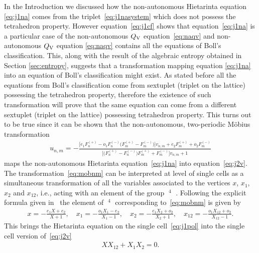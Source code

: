 \documentclass[pdftex]{sigma}
\numberwithin{equation}{section}
\DeclareMathOperator{\Mob}{M\ddot{o}b}
\newcommand{\QV}{Q_{\rm V}}
\begin{document}
In the Introduction we discussed how the non-autonomous
Hietarinta equation \eqref{eq:j1na} comes from the triplet~\eqref{eq:j1nasystem} which does not possess the tetrahedron property.
However equation~\eqref{eq:j1cf} shows that equation~\eqref{eq:j1na}
is a particular case of the non-autonomous $\QV$ equation~\eqref{eq:naqv}
and non-autonomous $\QV$ equation \eqref{eq:naqv} contains
all the equations of Boll's classif\/ication.
This, along with the result of the algebraic entropy obtained in
Section \ref{sec:entropy}, suggests that a transformation mapping
equation \eqref{eq:j1na} into an equation of Boll's classif\/ication might exist.
As stated before all the equations from Boll's classif\/ication come
from sextuplet (triplet on the lattice) possessing the tetrahedron property, therefore the existence
of such transformation will prove that the same equation
can come from a dif\/ferent sextuplet (triplet on the lattice) possessing tetrahedron property.
This turns out to be true since it can be shown that the non-autonomous,
two-periodic M\"obius transformation
\begin{gather}
 u_{n, m} = -\frac{\big[ e_{1} F_{n}^{(+)} - o_{1}F_{n}^{(-)}\big( F_{m}^{(+)}-F_{m}^{(-)} \big) \big]v_{n, m}
 +e_{2}F_{m}^{(+)}+o_{2}F_{m}^{(-)}}{
 \big[ \big( F_{n}^{(+)}-F_{n}^{(-)} \big)F_{m}^{(+)}+F_{m}^{(-)} \big]v_{n, m}+1}
 \label{eq:mobnm}
\end{gather}
maps the non-autonomous Hietarinta equation~\eqref{eq:j1na}
into equation~\eqref{eq:j2v}.
The transformation~\eqref{eq:mobnm} can be interpreted at
level of single cells as a simultaneous transformation of all
the variables associated to the vertices $x$, $x_{1}$, $x_{2}$
and $x_{12}$, i.e., acting with an element of the group
$\Mob^{4}$ \cite{ABS2003,AtkinsonPhD2008,GSL_general}.
Following the explicit formula given in~\cite{GSL_general}
the element of $\Mob^{4}$ corresponding to~\eqref{eq:mobnm}
is given by
\begin{gather}
 x = -\frac{e_{1} X +e_{2}}{X+1},
 \quad
 x_{1} = -\frac{o_{1} X_{1} -e_{2}}{X_{1}-1},
 \quad
 x_{2} = -\frac{e_{1} X_{2}+o_{2}}{X_{2}+1},
 \quad
 x_{12} = -\frac{o_{1} X_{12}+o_{2}}{X_{12}-1}. \label{eq:mob4}
\end{gather}
This brings the Hietarinta equation on the single cell~\eqref{eq:j1pol} into the single cell version of~\eqref{eq:j2v}
\begin{gather*}
 X X_{12} + X_{1}X_{2}=0. %
\end{gather*}
\end{document}
